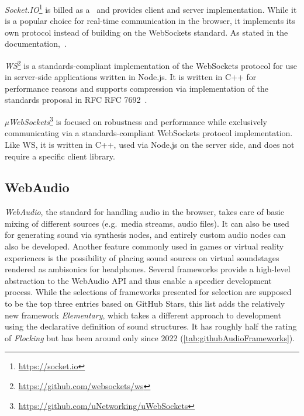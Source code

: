 

\emph{Socket.IO}\footnote{\url{https://socket.io}} is billed as a~ and provides client and server implementation.
While it is a popular choice for real-time communication in the browser, it implements its own protocol instead of building on the WebSockets standard.
As stated in the documentation,~.

\emph{WS}\footnote{\url{https://github.com/websockets/ws}} is a standards-compliant implementation of the WebSockets protocol for use in server-side applications written in Node.js.
It is written in C++ for performance reasons and supports compression via implementation of the standards proposal in \ac{RFC} RFC 7692~.

\emph{µWebSockets}\footnote{\url{https://github.com/uNetworking/uWebSockets}} is focused on robustness and performance while exclusively communicating via a standards-compliant WebSockets protocol implementation.
Like WS, it is written in C++, used via Node.js on the server side, and does not require a specific client library.

\subsection{WebAudio}
\label{subsec:webaudio}

\emph{WebAudio}, the standard for handling audio in the browser, takes care of basic mixing of different sources (e.g.\ media streams, audio files).
It can also be used for generating sound via synthesis nodes, and entirely custom audio nodes can also be developed.
Another feature commonly used in games or virtual reality experiences is the possibility of placing sound sources on virtual soundstages rendered as ambisonics for headphones.
Several frameworks provide a high-level abstraction to the WebAudio \ac{API} and thus enable a speedier development process.
While the selections of frameworks presented for selection are supposed to be the top three entries based on GitHub Stars, this list adds the relatively new framework \emph{Elementary}, which takes a different approach to development using the declarative definition of sound structures.
It has roughly half the rating of \emph{Flocking} but has been around only since 2022 (\ref{tab:githubAudioFrameworks}).

